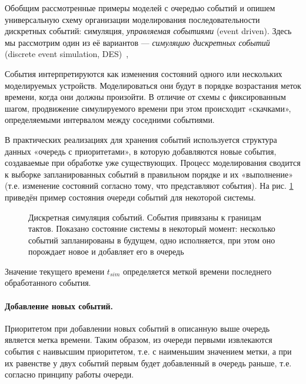 Обобщим рассмотренные примеры моделей с очередью событий и опишем универсальную схему организации моделирования последовательности дискретных событий: симуляция, \textit{управляемая событиями} (\abbr event driven). Здесь мы рассмотрим один из её вариантов — \textit{симуляцию дискретных событий} (\abbr discrete event simulation, DES)~\citep{fujimoto-parallel-dist-sim, introduction-to-des, Cain02preciseand},

События интерпретируются как изменения состояний одного или нескольких моделируемых устройств. Моделироваться они будут в порядке возрастания меток времени, когда они должны произойти. В отличие от схемы с фиксированным шагом, продвижение симулируемого времени при этом происходит «скачками», определяемыми интервалом между соседними событиями. 

В практических реализациях для хранения событий используется структура данных «очередь с приоритетами», в которую добавляются новые события, создаваемые при обработке уже существующих. Процесс моделирования сводится к выборке запланированных событий в правильном порядке и их «выполнение» (т.е. изменение состояний согласно тому, что представляют события). На рис. \ref{fig:queue1} приведён пример состояния очереди событий для некоторой системы.

\begin{figure}[htp]
    \centering
    \caption[Дискретная симуляция событий]{Дискретная симуляция событий. События привязаны к границам тактов. Показано состояние системы в некоторый момент: несколько событий запланированы в будущем, одно исполняется, при этом оно порождает новое и добавляет его в очередь}
    \label{fig:queue1}
\end{figure}

Значение текущего времени $t_{sim}$ определяется меткой времени последнего обработанного события.

\paragraph{Добавление новых событий.} Приоритетом при добавлении новых событий в описанную выше очередь является метка времени. Таким образом, из очереди первыми извлекаются события с наивысшим приоритетом, т.е. с наименьшим значением метки, а при их равенстве у двух событий первым будет добавленный в очередь раньше, т.е. согласно принципу работы очереди.

%

